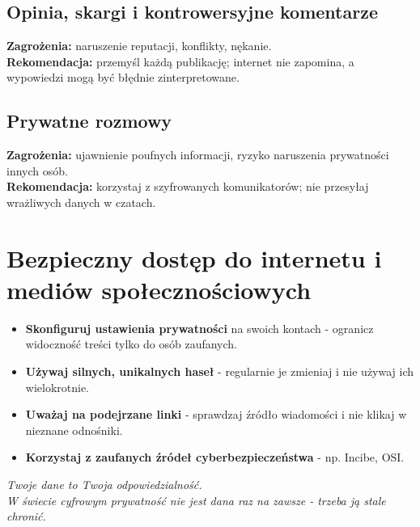 \subsection{Opinia, skargi i kontrowersyjne komentarze}
\textbf{Zagrożenia:} naruszenie reputacji, konflikty, nękanie.\\
\textbf{Rekomendacja:} przemyśl każdą publikację; internet nie zapomina, a wypowiedzi mogą być błędnie zinterpretowane.

\subsection{Prywatne rozmowy}
\textbf{Zagrożenia:} ujawnienie poufnych informacji, ryzyko naruszenia prywatności innych osób.\\
\textbf{Rekomendacja:} korzystaj z szyfrowanych komunikatorów; nie przesyłaj wrażliwych danych w czatach.

\section{Bezpieczny dostęp do internetu i mediów społecznościowych}

\begin{itemize}
  \item \textbf{Skonfiguruj ustawienia prywatności} na swoich kontach - ogranicz widoczność treści tylko do osób zaufanych.
  \item \textbf{Używaj silnych, unikalnych haseł} - regularnie je zmieniaj i nie używaj ich wielokrotnie.
  \item \textbf{Uważaj na podejrzane linki} - sprawdzaj źródło wiadomości i nie klikaj w nieznane odnośniki.
  \item \textbf{Korzystaj z zaufanych źródeł cyberbezpieczeństwa} - np. Incibe, OSI.
\end{itemize}

\begin{center}
\textit{Twoje dane to Twoja odpowiedzialność.\\
W świecie cyfrowym prywatność nie jest dana raz na zawsze - trzeba ją stale chronić.}
\end{center}